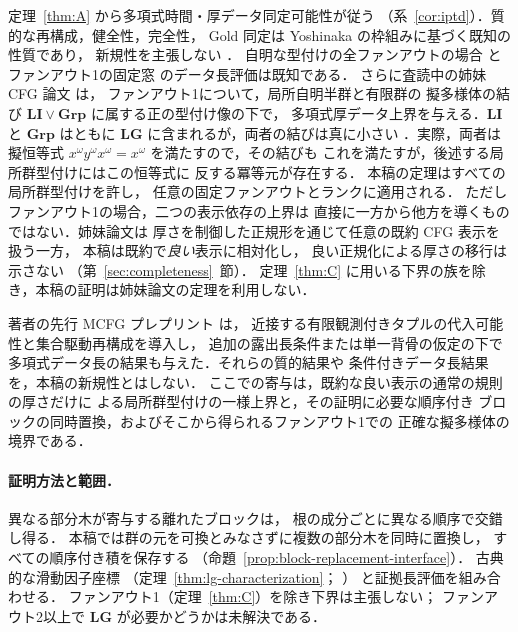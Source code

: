 \documentclass[11pt,a4paper]{ltjsarticle}
\numberwithin{equation}{section}
\theoremstyle{plain}
\theoremstyle{definition}
\theoremstyle{remark}
\theoremstyle{plain}
\begin{document}
定理~\ref{thm:A} から多項式時間・厚データ同定可能性が従う
（系~\ref{cor:iptd}）．質的な再構成，健全性，完全性，
Gold 同定は Yoshinaka の枠組みに基づく既知の性質であり，
新規性を主張しない
\cite{Yoshinaka2011,Yoshinaka2015General}．
自明な型付けの全ファンアウトの場合
\cite{Yoshinaka2011} とファンアウト1の固定窓
\cite{Yoshinaka2008} のデータ長評価は既知である．
さらに査読中の姉妹 CFG 論文 \cite{kuriyamaCFG} は，
ファンアウト1について，局所自明半群と有限群の
擬多様体の結び $\mathbf{LI}\vee\mathbf{Grp}$ に属する正の型付け像の下で，
多項式厚データ上界を与える．$\mathbf{LI}$ と $\mathbf{Grp}$ はともに
$\mathbf{LG}$ に含まれるが，両者の結びは真に小さい
\cite{CostaNogueiraTeixeira2021}．実際，両者は擬恒等式
$x^\omega y^\omega x^\omega=x^\omega$ を満たすので，その結びも
これを満たすが，後述する局所群型付けにはこの恒等式に
反する冪等元が存在する．
本稿の定理はすべての局所群型付けを許し，
任意の固定ファンアウトとランクに適用される．
ただしファンアウト1の場合，二つの表示依存の上界は
直接に一方から他方を導くものではない．姉妹論文は
厚さを制御した正規形を通じて任意の既約 CFG 表示を扱う一方，
本稿は既約で\emph{良い}表示に相対化し，
良い正規化による厚さの移行は示さない
（第~\ref{sec:completeness}~節）．
定理~\ref{thm:C} に用いる下界の族を除き，本稿の証明は姉妹論文の定理を利用しない．

著者の先行 MCFG プレプリント \cite{KuriyamaMCFGpreprint} は，
近接する有限観測付きタプルの代入可能性と集合駆動再構成を導入し，
追加の露出長条件または単一背骨の仮定の下で
多項式データ長の結果も与えた．それらの質的結果や
条件付きデータ長結果を，本稿の新規性とはしない．
ここでの寄与は，既約な良い表示の通常の規則の厚さだけに
よる局所群型付けの一様上界と，その証明に必要な順序付き
ブロックの同時置換，およびそこから得られるファンアウト1での
正確な擬多様体の境界である．

\paragraph{証明方法と範囲．}
異なる部分木が寄与する離れたブロックは，
根の成分ごとに異なる順序で交錯し得る．
本稿では群の元を可換とみなさずに複数の部分木を同時に置換し，
すべての順序付き積を保存する
（命題~\ref{prop:block-replacement-interface}）．
古典的な滑動因子座標
（定理~\ref{thm:lg-characterization}；
\cite{Straubing1985,Tilson1987,AlmeidaEtAl2009}）
と証拠長評価を組み合わせる．
ファンアウト1（定理~\ref{thm:C}）を除き下界は主張しない；
ファンアウト2以上で $\mathbf{LG}$ が必要かどうかは未解決である．
\end{document}
